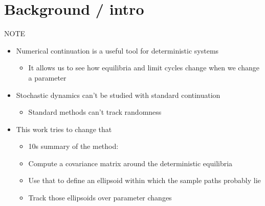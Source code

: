 \documentclass[presentation]{beamer}
\author{mark}
\date{\today}
\title{}
\begin{document}
\section{Background / intro}
\label{sec:orgf3b5278}
\begin{frame}[label={sec:org391c4b6},plain]{NOTE}
\begin{itemize}
\item Numerical continuation is a useful tool for deterministic systems
\begin{itemize}
\item It allows us to see how equilibria and limit cycles change when we change a parameter
\end{itemize}
\end{itemize}
\vfill
\begin{itemize}
\item Stochastic dynamics can't be studied with standard continuation
\begin{itemize}
\item Standard methods can't track randomness
\end{itemize}
\end{itemize}
\vfill
\begin{itemize}
\item This work tries to change that
\begin{itemize}
\item 10s summary of the method:
\item Compute a covariance matrix around the deterministic equilibria
\item Use that to define an ellipsoid within which the sample paths probably lie
\item Track those ellipsoids over parameter changes
\end{itemize}
\end{itemize}
\end{frame}
\end{document}
